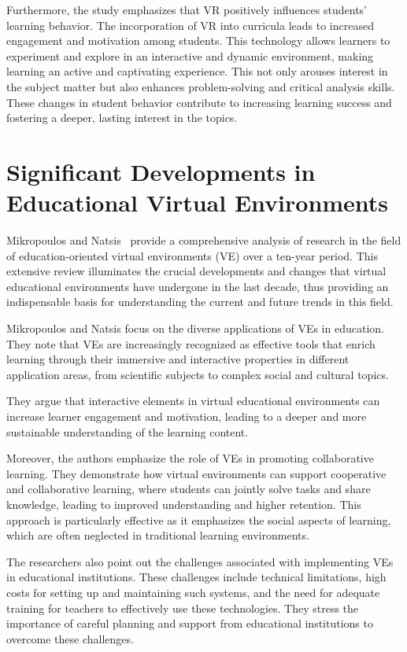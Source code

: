 \documentclass[draft, final]{vutinfth} %
\begin{document}
Furthermore, the study emphasizes that VR positively influences students' learning behavior. The incorporation of VR into curricula leads to increased engagement and motivation among students. This technology allows learners to experiment and explore in an interactive and dynamic environment, making learning an active and captivating experience. This not only arouses interest in the subject matter but also enhances problem-solving and critical analysis skills. These changes in student behavior contribute to increasing learning success and fostering a deeper, lasting interest in the topics.

\section{Significant Developments in Educational Virtual Environments}

Mikropoulos and Natsis~\cite{mikropoulos2011educational} provide a comprehensive analysis of research in the field of education-oriented virtual environments (VE) over a ten-year period. This extensive review illuminates the crucial developments and changes that virtual educational environments have undergone in the last decade, thus providing an indispensable basis for understanding the current and future trends in this field.

Mikropoulos and Natsis focus on the diverse applications of VEs in education. They note that VEs are increasingly recognized as effective tools that enrich learning through their immersive and interactive properties in different application areas, from scientific subjects to complex social and cultural topics.

They argue that interactive elements in virtual educational environments can increase learner engagement and motivation, leading to a deeper and more sustainable understanding of the learning content.

Moreover, the authors emphasize the role of VEs in promoting collaborative learning. They demonstrate how virtual environments can support cooperative and collaborative learning, where students can jointly solve tasks and share knowledge, leading to improved understanding and higher retention. This approach is particularly effective as it emphasizes the social aspects of learning, which are often neglected in traditional learning environments.

The researchers also point out the challenges associated with implementing VEs in educational institutions. These challenges include technical limitations, high costs for setting up and maintaining such systems, and the need for adequate training for teachers to effectively use these technologies. They stress the importance of careful planning and support from educational institutions to overcome these challenges.
\end{document}
